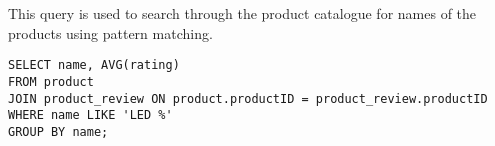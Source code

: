 This query is used to search through the product catalogue for names of the products using pattern matching.

\begin{lstlisting}
SELECT name, AVG(rating)
FROM product
JOIN product_review ON product.productID = product_review.productID
WHERE name LIKE 'LED %'
GROUP BY name;
\end{lstlisting}